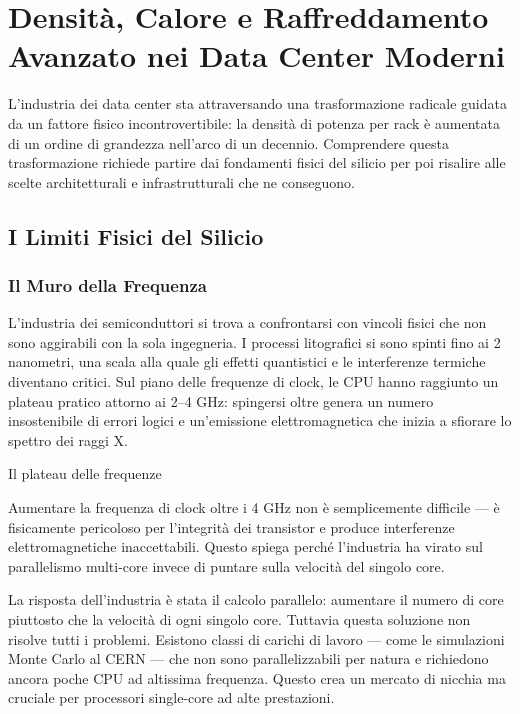 \documentclass[
  italian,
  openany]{book}
\begin{document}
\newpage

\chapter{Densità, Calore e Raffreddamento Avanzato nei Data Center
Moderni}\label{densituxe0-calore-e-raffreddamento-avanzato-nei-data-center-moderni}

L'industria dei data center sta attraversando una trasformazione
radicale guidata da un fattore fisico incontrovertibile: la densità di
potenza per rack è aumentata di un ordine di grandezza nell'arco di un
decennio. Comprendere questa trasformazione richiede partire dai
fondamenti fisici del silicio per poi risalire alle scelte
architetturali e infrastrutturali che ne conseguono.

\section{I Limiti Fisici del Silicio}\label{i-limiti-fisici-del-silicio}

\subsection{Il Muro della Frequenza}\label{il-muro-della-frequenza}

L'industria dei semiconduttori si trova a confrontarsi con vincoli
fisici che non sono aggirabili con la sola ingegneria. I processi
litografici si sono spinti fino ai 2 nanometri, una scala alla quale gli
effetti quantistici e le interferenze termiche diventano critici. Sul
piano delle frequenze di clock, le CPU hanno raggiunto un plateau
pratico attorno ai 2--4 GHz: spingersi oltre genera un numero
insostenibile di errori logici e un'emissione elettromagnetica che
inizia a sfiorare lo spettro dei raggi X.

\begin{calloutwarning}{Il plateau delle frequenze}

Aumentare la frequenza di clock oltre i 4 GHz non è semplicemente
difficile --- è fisicamente pericoloso per l'integrità dei transistor e
produce interferenze elettromagnetiche inaccettabili. Questo spiega
perché l'industria ha virato sul parallelismo multi-core invece di
puntare sulla velocità del singolo core.

\end{calloutwarning}

La risposta dell'industria è stata il calcolo parallelo: aumentare il
numero di core piuttosto che la velocità di ogni singolo core. Tuttavia
questa soluzione non risolve tutti i problemi. Esistono classi di
carichi di lavoro --- come le simulazioni Monte Carlo al CERN --- che
non sono parallelizzabili per natura e richiedono ancora poche CPU ad
altissima frequenza. Questo crea un mercato di nicchia ma cruciale per
processori single-core ad alte prestazioni.
\end{document}
